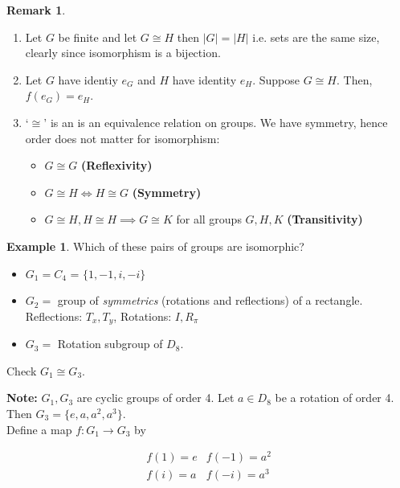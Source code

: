 \documentclass{article}
\theoremstyle{definition}
\newtheorem*{remark}{Remark}
\newtheorem*{exmp}{Example}
\newcommand{\ism}{\cong}
\begin{document}
\begin{remark}\hfill
\begin{enumerate}
  \item Let $G$ be finite and let $G \ism H$ then $|G|=|H|$ i.e. sets are the same size, clearly since isomorphism is a bijection.
  \item Let $G$ have identiy $e_G$ and $H$ have identity $e_H$. Suppose $G \ism H$. Then, $f(e_G)=e_H$.
  \item `$\ism$' is an is an equivalence relation on groups.
   We have symmetry, hence order does not matter for isomorphism:
    \begin{itemize}
      \item$G \ism G $ \textbf{(Reflexivity)}
      \item$G \ism H \iff H \ism G$ \textbf{(Symmetry)}
      \item $G \ism H, H \ism H \implies G \ism K $ for all groups $G,H,K$\textbf{ (Transitivity)}\\
    \end{itemize}
\end{enumerate}
\end{remark}

\begin{exmp}
Which of these pairs of groups are isomorphic?
\begin{itemize}
  \item 
$G_1 = C_4$ = $\{1,-1,i,-i\}$
  \item
$G_2 = $ group of \emph{symmetrics} (rotations and reflections) of a rectangle.\\
Reflections: $T_x, T_y$, Rotations: $I, R_\pi$
  \item $G_3 = $ Rotation subgroup of $D_8$.
\end{itemize}
  
Check $G_1 \ism G_3$.
\end{exmp}

\textbf{Note:} $G_1, G_3$ are cyclic groups of order 4. Let $a \in D_8$ be a rotation of order 4. 
Then $G_3 = \{e,a,a^2, a^3\}$.\hfill\\

Define a map $f:G_1 \rightarrow G_3$ by 

\begin{equation*}
  \begin{matrix}
    f(1)=e & f(-1) = a^2 \\
    f(i)=a & f(-i) = a^3
  \end{matrix}
  \label{}
\end{equation*}
\end{document}
